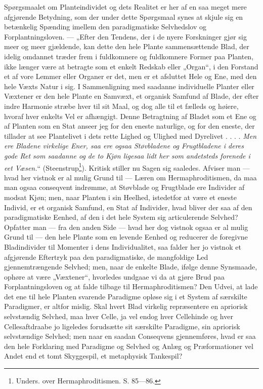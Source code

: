 \documentclass[12pt,a4paper]{book}
\begin{document}
Spørgsmaalet om Planteindividet og dets Realitet er her af en saa meget mere
afgjørende Betydning, som der under dette Spørgsmaal synes at skjule sig en
betænkelig Spænding imellem den paradigmatiske Selvhedslov og
Forplantningsloven. --- „Efter den Tendens, der i de nyere Forskninger gjør sig
meer og meer gjældende, kan dette den hele Plante sammensættende Blad, der
idelig omdannet træder frem i fuldkomnere og fuldkomnere Former paa Planten,
ikke længer være at betragte som et enkelt Redskab eller „Organ“, i den Forstand
et af vore Lemmer eller Organer er det, men er et afsluttet Hele og Ene, med den
hele Væxts Natur i sig. I Sammenligning med saadanne individuelle Planter eller
Væxtener er den hele Plante en Samvæxt, et organisk Samfund af Blade, der efter
indre Harmonie stræbe hver til sit Maal, og dog alle til et fælleds og høiere,
hvoraf hver enkelts Vel er afhængigt. Denne Betragtning af Bladet som et Ene og
af Planten som en Stat anseer jeg for den eneste naturlige, og for den eneste,
der tillader at see Plantelivet i dets rette Lighed og Ulighed med Dyrelivet
. . . .
\emph{Men ere Bladene virkelige Ener, saa ere ogsaa Støvbladene og Frugtbladene
i deres gode Ret som saadanne og de to Kjøn ligesaa lidt her som andetsteds
forenede i eet Væsen.}“ (Steenstrup\footnote{Unders. over Hermaphroditismen.
S. 85---86.}).
Kritisk stiller nu Sagen sig saaledes. Afviser man --- hvad her vistnok er al
mulig Grund til --- Læren om Hermaphroditismen, da maa man ogsaa conseqvent
indrømme, at Støvblade og Frugtblade ere Individer af modsat Kjøn; men, naar
Planten i sin Heelhed, istedetfor at være et eneste Individ, er et organisk
Samfund, en Stat af Individer, hvad bliver der saa af den paradigmatiske
Eenhed, af den i det hele System sig articulerende Selvhed? Opfatter man --- fra
den anden Side --- hvad her dog vistnok ogsaa er al mulig Grund til --- den hele
Plante som en levende Eenhed og reducerer de foregivne Bladindivider til
Momenter i dens Individualitet, saa falder her jo vistnok et afgjørende
Eftertryk paa den paradigmatiske, de mangfoldige Led gjennemtrængende Selvhed;
men, naar de enkelte Blade, ifølge denne Synsmaade, ophøre at være „Væxtener“,
hvorledes undgaae vi da at gjøre Brud paa Forplantningsloven og at falde tilbage
til Hermaphroditismen? Den Udvei, at lade det ene til hele Planten svarende
Paradigme opløse sig i et System af særskilte Paradigmer, er altfor mislig. Skal
hvert Blad virkelig repræsentere en apriorisk selvstændig Selvhed, maa hver
Celle, ja vel endog hver Cellehinde og hver Cellesaftdraabe jo ligeledes
forudsætte sit særskilte Paradigme, sin apriorisk selvstændige Selvhed; men naar
en saadan Conseqvens gjennemføres, hvad er saa den hele Forklaring med Paradigme
og Selvhed og Anlæg og Præformationer vel Andet end et tomt Skyggespil, et
metaphysisk Tankespil?
\end{document}
